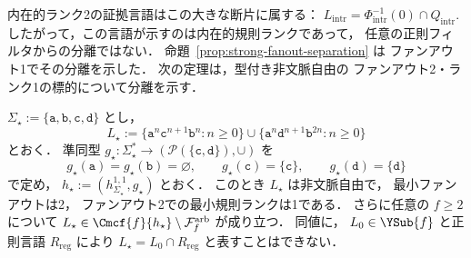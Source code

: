 内在的ランク2の証拠言語はこの大きな断片に属する：
\(L_{\mathrm{intr}} =\Phi_{\mathrm{intr}}^{-1}(0)\cap Q_{\mathrm{intr}}.\)
したがって，この言語が示すのは内在的規則ランクであって，
任意の正則フィルタからの分離ではない．
命題~\ref{prop:strong-fanout-separation} は
ファンアウト1でその分離を示した．
次の定理は，型付き非文脈自由の
ファンアウト2・ランク1の標的について分離を示す．

\begin{theorem}
\label{thm:arbitrary-filter-separation}
$\Sigma_\star:=\{\mathtt a,\mathtt b,\mathtt c,\mathtt d\}$ とし，
\[
 L_\star
 :=\{\mathtt a^n\mathtt c^{n+1}\mathtt b^n:n\ge0\}
   \cup
   \{\mathtt a^n\mathtt d^{n+1}\mathtt b^{2n}:n\ge0\}
\]
とおく．
準同型
$g_\star:\Sigma_\star^*
\to(\mathcal P(\{\mathtt c,\mathtt d\}),\cup)$ を
\[
 g_\star(\mathtt a)=g_\star(\mathtt b)=\varnothing,
 \qquad
 g_\star(\mathtt c)=\{\mathtt c\},
 \qquad
 g_\star(\mathtt d)=\{\mathtt d\}
\]
で定め，
\(h_\star:=(h_{\Sigma_\star}^{1,1},g_\star)\)
とおく．
このとき $L_\star$ は非文脈自由で，
最小ファンアウトは2，
ファンアウト2での最小規則ランクは1である．
さらに任意の $f\ge2$ について
\(L_\star \in\Cmcf{f}{h_\star} \setminus\mathcal F_f^{\mathrm{arb}}\)
が成り立つ．
同値に，
$L_0\in\YSub{f}$ と正則言語 $R_{\mathrm{reg}}$ により
$L_\star=L_0\cap R_{\mathrm{reg}}$
と表すことはできない．
\end{theorem}

